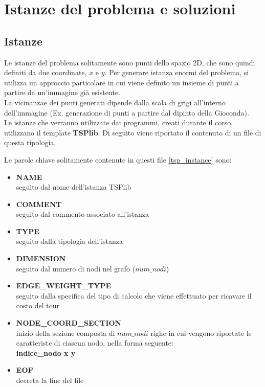 \chapter{Istanze del problema e soluzioni}
\section{Istanze}
Le istanze del problema solitamente sono punti dello spazio 2D, che sono quindi definiti da due coordinate, $x$ e $y$.
Per generare istanza enormi del problema, si utilizza un approccio particolare in cui viene definito un insieme di punti a partire da un'immagine già esistente.\\
La vicinanzae dei punti generati dipende dalla scala di grigi all'interno dell'immagine (Ex. generazione di punti a partire dal dipinto della Gioconda\cite{monnalisa}).\\
Le istanze che verranno utilizzate dai programmi, creati durante il corso, utilizzano il template \textbf{TSPlib}. Di seguito viene riportato il contenuto di un file di questa tipologia.
 


Le parole chiave solitamente contenute in questi file \ref{tsp_instance} sono:
\begin{itemize}
\item{\textbf{NAME}\\
seguito dal nome dell'istanza TSPlib}
\item{\textbf{COMMENT}\\
seguito dal commento associato all'istanza}
\item{\textbf{TYPE}\\
seguito dalla tipologia dell'istanza}
\item{\textbf{DIMENSION}\\
seguito dal numero di nodi nel grafo ($num\_nodi$)}
\item{\textbf{EDGE\_WEIGHT\_TYPE}\\
seguito dalla specifica del tipo di calcolo che viene effettuato per ricavare il costo del tour}
\item{\textbf{NODE\_COORD\_SECTION}\\
inizio della sezione composta di $num\_nodi$ righe in cui vengono riportate le caratteriste di ciascun nodo, nella forma seguente:\\
\textbf{indice\_nodo  x  y}}
\item{\textbf{EOF}\\
decreta la fine del file}
\end{itemize}


